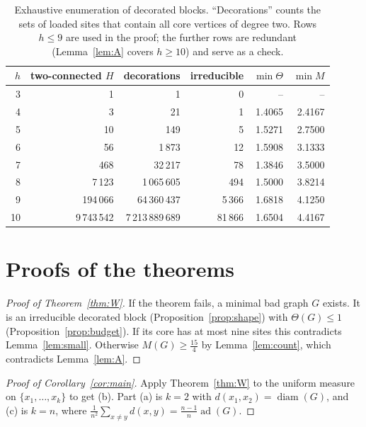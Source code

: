 \documentclass[11pt,a4paper]{article}
\theoremstyle{definition}
\theoremstyle{remark}
\numberwithin{equation}{section}
\newcommand{\ad}{\operatorname{ad}}
\newcommand{\diam}{\operatorname{diam}}
\begin{document}
\begin{table}[ht]
\centering\small
\begin{tabular}{rrrrrr}
\toprule
$h$ & two-connected $H$ & decorations & irreducible & $\min\Theta$ & $\min M$\\
\midrule
3 & 1 & 1 & 0 & -- & --\\
4 & 3 & 21 & 1 & 1.4065 & 2.4167\\
5 & 10 & 149 & 5 & 1.5271 & 2.7500\\
6 & 56 & 1\,873 & 12 & 1.5908 & 3.1333\\
7 & 468 & 32\,217 & 78 & 1.3846 & 3.5000\\
8 & 7\,123 & 1\,065\,605 & 494 & 1.5000 & 3.8214\\
9 & 194\,066 & 64\,360\,437 & 5\,366 & 1.6818 & 4.1250\\
\midrule
10 & 9\,743\,542 & 7\,213\,889\,689 & 81\,866 & 1.6504 & 4.4167\\

\bottomrule
\end{tabular}
\caption{Exhaustive enumeration of decorated blocks. ``Decorations'' counts the sets
of loaded sites that contain all core vertices of degree two. Rows $h\le9$ are used
in the proof; the further rows are redundant (Lemma~\ref{lem:A} covers $h\ge10$) and
serve as a check.}
\label{tab:blocks}
\end{table}

\section{Proofs of the theorems}\label{sec:proofs}

\begin{proof}[Proof of Theorem~\ref{thm:W}]
If the theorem fails, a minimal bad graph $G$ exists. It is an irreducible
decorated block (Proposition~\ref{prop:shape}) with $\Theta(G)\le1$
(Proposition~\ref{prop:budget}). If its core has at most nine sites this contradicts
Lemma~\ref{lem:small}. Otherwise $M(G)\ge\frac{15}4$ by Lemma~\ref{lem:count}, which
contradicts Lemma~\ref{lem:A}.
\end{proof}

\begin{proof}[Proof of Corollary~\ref{cor:main}]
Apply Theorem~\ref{thm:W} to the uniform measure on $\{x_1,\dots,x_k\}$ to get (b).
Part (a) is $k=2$ with $d(x_1,x_2)=\diam(G)$, and (c) is $k=n$, where
$\frac1{n^2}\sum_{x\ne y}d(x,y)=\frac{n-1}n\ad(G)$.
\end{proof}
\end{document}

